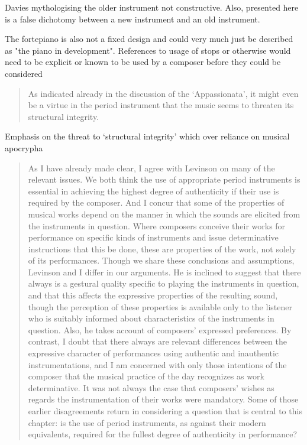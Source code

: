 Davies mythologising the older instrument not constructive. Also, presented here
is a false dichotomy between a new instrument and an old instrument.

The fortepiano is also not a fixed design and could very much just be described
as "the piano in development". References to usage of stops or otherwise would
need to be explicit or known to be used by a composer before they could be
considered



\begin{quotation}
    As indicated already in the discussion of the ‘Appassionata’, it might even
    be a virtue in the period instrument that the music seems to threaten its
    structural integrity.
\end{quotation}

Emphasis on the threat to `structural integrity' which over reliance on musical
apocrypha       


\begin{quotation}
As I have already made clear, I agree with Levinson on many of the relevant
issues. We both think the use of appropriate period instruments is essential in
achieving the highest degree of authenticity if their use is required by the
composer. And I concur that some of the properties of musical works depend on
the manner in which the sounds are elicited from the instruments in question.
Where composers conceive their works for performance on specific kinds of
instruments and issue determinative instructions that this be done, these are
properties of the work, not solely of its performances. Though we share these
conclusions and assumptions, Levinson and I differ in our arguments. He is
inclined to suggest that there always is a gestural quality specific to playing
the instruments in question, and that this affects the expressive properties of
the resulting sound, though the perception of these properties is available only
to the listener who is suitably informed about characteristics of the
instruments in question. Also, he takes account of composers' expressed
preferences. By contrast, I doubt that there always are relevant differences
between the expressive character of performances using authentic and inauthentic
instrumentations, and I am concerned with only those intentions of the composer
that the musical practice of the day recognizes as work determinative. It was
not always the case that composers' wishes as regards the instrumentation of
their works were mandatory. Some of those earlier disagreements return in
considering a question that is central to this chapter: is the use of period
instruments, as against their modern equivalents, required for the fullest
degree of authenticity in performance?

\end{quotation}

